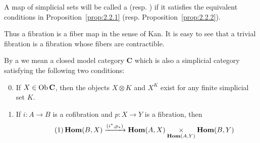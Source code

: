 \documentclass[../main]{subfiles}
\begin{document}
\begin{definition}\label{def:2.2.1}
    A map of simplicial sets will be called a  (resp. ) if it satisfies the equivalent conditions in Proposition~\ref{prop:2.2.1} (resp. Proposition~\ref{prop:2.2.2}).
\end{definition}
Thus a fibration is a fiber map in the sense of Kan. It is easy to see that a trivial fibration is a fibration whose fibers are contractible. 
\begin{definition}
    By a  we mean a closed model category $\mathbf{C}$ which is also a simplicial category satisfying the following two conditions: 
    \begin{enumerate}[label = SM\arabic*]
    \setcounter{enumi}{-1}
        \item\label{SM0} \label{def:closedsimplicialcat_SM0} If $X \in \operatorname{Ob} \mathbf{C}$, then the objects $X \otimes K$ and $X^K$ exist for any finite simplicial set $K$.\setcounter{enumi}{6}
        \item\label{SM7} \label{def:closedsimplicialcat_SM7} If $i \colon A \longrightarrow  B$ is a cofibration and $p \colon X \longrightarrow  Y$ is a fibration, then 
        \[\tag{1}\label{eq:2.2.1}
            \operatorname{\mathbf{Hom}}(B,X) \xrightarrow{(i^*,p_*)} \operatorname{\mathbf{Hom}}(A,X)\underset{\operatorname{\mathbf{Hom}}(A,Y)}{\times}\operatorname{\mathbf{Hom}}(B,Y)
        \]
    \end{enumerate}
\end{definition}
\end{document}
